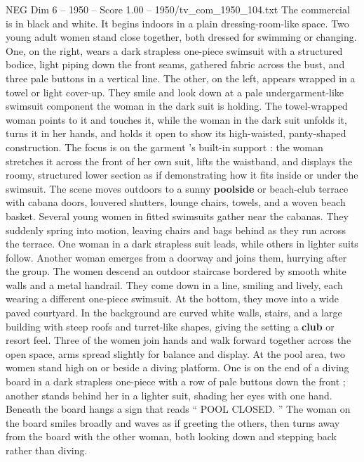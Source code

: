 \begin{textsample}{NEG Dim 6 – 1950 – Score 1.00 – 1950/tv\_com\_1950\_104.txt}  \label{ex:f6_neg_089}
The commercial is in black and white.
It begins indoors in a plain dressing-room-like space.
Two young adult women stand close together, both dressed for swimming or changing.
One, on the right, wears a dark strapless one-piece swimsuit with a structured bodice, light piping down the front seams, gathered fabric across the bust, and three pale buttons in a vertical line.
The other, on the left, appears wrapped in a towel or light cover-up.
They smile and look down at a pale undergarment-like swimsuit component the woman in the dark suit is holding.
The towel-wrapped woman points to it and touches it, while the woman in the dark suit unfolds it, turns it in her hands, and holds it open to show its high-waisted, panty-shaped construction.
The focus is on the garment ’s built-in support : the woman stretches it across the front of her own suit, lifts the waistband, and displays the roomy, structured lower section as if demonstrating how it fits inside or under the swimsuit.
The scene moves outdoors to a sunny \textbf{poolside} or beach-club terrace with cabana doors, louvered shutters, lounge chairs, towels, and a woven beach basket.
Several young women in fitted swimsuits gather near the cabanas.
They suddenly spring into motion, leaving chairs and bags behind as they run across the terrace.
One woman in a dark strapless suit leads, while others in lighter suits follow.
Another woman emerges from a doorway and joins them, hurrying after the group.
The women descend an outdoor staircase bordered by smooth white walls and a metal handrail.
They come down in a line, smiling and lively, each wearing a different one-piece swimsuit.
At the bottom, they move into a wide paved courtyard.
In the background are curved white walls, stairs, and a large building with steep roofs and turret-like shapes, giving the setting a \textbf{club} or resort feel.
Three of the women join hands and walk forward together across the open space, arms spread slightly for balance and display.
At the pool area, two women stand high on or beside a diving platform.
One is on the end of a diving board in a dark strapless one-piece with a row of pale buttons down the front ; another stands behind her in a lighter suit, shading her eyes with one hand.
Beneath the board hangs a sign that reads “ POOL CLOSED. ” The woman on the board smiles broadly and waves as if greeting the others, then turns away from the board with the other woman, both looking down and stepping back rather than diving.

\end{textsample}
